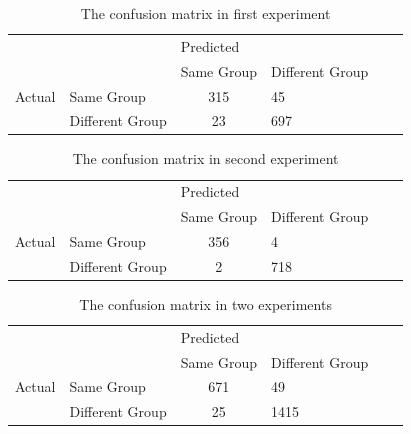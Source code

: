 \documentclass[a4paper,12pt]{report}
\begin{document}
\begin{table}[btph]
\begin{center}
\caption{The confusion matrix in first experiment}
\label{t:ConfusionMatrixFirst}
\begin{tabular}{llclcl}
 &  & \multicolumn{2}{l}{Predicted} \\
 & \multicolumn{1}{l|}{} & Same Group & Different Group \\ \cline{2-4} 
\multicolumn{1}{c}{Actual} & \multicolumn{1}{l|}{Same Group} & 315 & 45 \\
 & \multicolumn{1}{l|}{Different Group} & 23 & 697
\end{tabular}

\end{center}
\end{table}

\begin{table}[btph]
\begin{center}
\caption{The confusion matrix in second experiment}
\label{t:ConfusionMatrixSecond}
\begin{tabular}{llclcl}
 &  & \multicolumn{2}{l}{Predicted} \\
 & \multicolumn{1}{l|}{} & Same Group & Different Group \\ \cline{2-4} 
\multicolumn{1}{c}{Actual} & \multicolumn{1}{l|}{Same Group} & 356 & 4 \\
 & \multicolumn{1}{l|}{Different Group} & 2 & 718
\end{tabular}

\end{center}
\end{table}
\begin{table}[btph]
\begin{center}
\caption{The confusion matrix in two experiments}
\label{t:ConfusionMatrixCombine}
\begin{tabular}{llclcl}
 &  & \multicolumn{2}{l}{Predicted} \\
 & \multicolumn{1}{l|}{} & Same Group & Different Group \\ \cline{2-4} 
\multicolumn{1}{c}{Actual} & \multicolumn{1}{l|}{Same Group} & 671 & 49 \\
 & \multicolumn{1}{l|}{Different Group} & 25 & 1415
\end{tabular}

\end{center}
\end{table}
\clearpage
\end{document}
